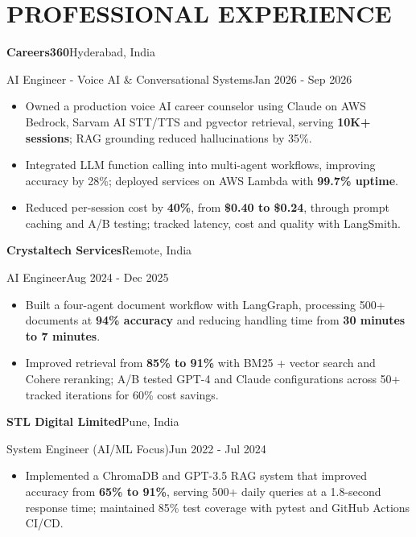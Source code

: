 \documentclass[10pt,a4paper]{article}
\newcommand{\experience}[4]{%
  \needspace{5\baselineskip}%
  {\bfseries #1}\hfill{\small\color{muted}#2}\par
  {\small #3}\hfill{\small\color{muted}#4}\par}
\begin{document}
\section*{PROFESSIONAL EXPERIENCE}
\experience{Careers360}{Hyderabad, India}{AI Engineer - Voice AI \& Conversational Systems}{Jan 2026 - Sep 2026}
\begin{itemize}
\item Owned a production voice AI career counselor using Claude on AWS Bedrock, Sarvam AI STT/TTS and pgvector retrieval, serving \textbf{10K+ sessions}; RAG grounding reduced hallucinations by 35\%.
\item Integrated LLM function calling into multi-agent workflows, improving accuracy by 28\%; deployed services on AWS Lambda with \textbf{99.7\% uptime}.
\item Reduced per-session cost by \textbf{40\%}, from \textbf{\$0.40 to \$0.24}, through prompt caching and A/B testing; tracked latency, cost and quality with LangSmith.
\end{itemize}\vspace{3pt}
\experience{Crystaltech Services}{Remote, India}{AI Engineer}{Aug 2024 - Dec 2025}
\begin{itemize}
\item Built a four-agent document workflow with LangGraph, processing 500+ documents at \textbf{94\% accuracy} and reducing handling time from \textbf{30 minutes to 7 minutes}.
\item Improved retrieval from \textbf{85\% to 91\%} with BM25 + vector search and Cohere reranking; A/B tested GPT-4 and Claude configurations across 50+ tracked iterations for 60\% cost savings.
\end{itemize}\vspace{3pt}
\experience{STL Digital Limited}{Pune, India}{System Engineer (AI/ML Focus)}{Jun 2022 - Jul 2024}
\begin{itemize}
\item Implemented a ChromaDB and GPT-3.5 RAG system that improved accuracy from \textbf{65\% to 91\%}, serving 500+ daily queries at a 1.8-second response time; maintained 85\% test coverage with pytest and GitHub Actions CI/CD.
\end{itemize}\vspace{3pt}
\end{document}
